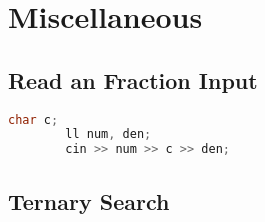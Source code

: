 \chapter{Miscellaneous}

\section{Read an Fraction Input}

    \begin{lstlisting}[language=c++]
        char c;
        ll num, den;
        cin >> num >> c >> den;
    \end{lstlisting}
    

\section{Ternary Search}

